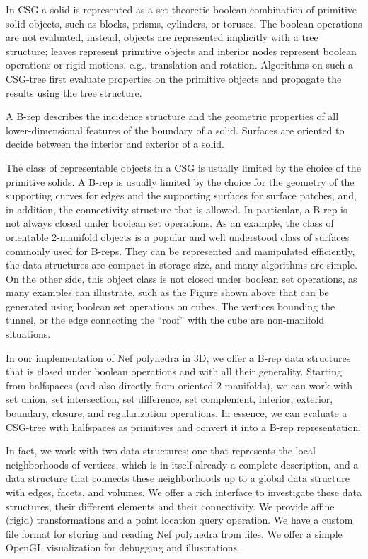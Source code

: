In CSG a solid is represented as a set-theoretic boolean combination
of primitive solid objects, such as blocks, prisms, cylinders, or
toruses.  The boolean operations are not evaluated, instead, objects
are represented implicitly with a tree structure; leaves represent
primitive objects and interior nodes represent boolean operations or
rigid motions, e.g., translation and rotation. Algorithms on such a
CSG-tree first evaluate properties on the primitive objects and
propagate the results using the tree structure.
 
A B-rep describes the incidence structure and the geometric properties
of all lower-dimensional features of the boundary of a solid. Surfaces
are oriented to decide between the interior and exterior of a solid.

The class of representable objects in a CSG is usually limited by the
choice of the primitive solids. A B-rep is usually limited by the
choice for the geometry of the supporting curves for edges and the
supporting surfaces for surface patches, and, in addition, the
connectivity structure that is allowed. In particular, a B-rep is not
always closed under boolean set operations.  As an example, the class
of orientable 2-manifold objects is a popular and well understood
class of surfaces commonly used for B-reps. They can be represented
and manipulated efficiently, the data structures are compact in
storage size, and many algorithms are simple. On the other side, this
object class is not closed under boolean set operations, as many
examples can illustrate, such as the Figure shown above that can be
generated using boolean set operations on cubes. The vertices bounding
the tunnel, or the edge connecting the ``roof'' with the cube are
non-manifold situations.

In our implementation of Nef polyhedra in 3D, we offer a B-rep data
structures that is closed under boolean operations and with all their
generality. Starting from halfspaces (and also directly from oriented
2-manifolds), we can work with set union, set intersection, set
difference, set complement, interior, exterior, boundary, closure, and
regularization operations. In essence, we can evaluate a CSG-tree with
halfspaces as primitives and convert it into a B-rep representation.

In fact, we work with two data structures; one that represents the
local neighborhoods of vertices, which is in itself already a complete
description, and a data structure that connects these neighborhoods up
to a global data structure with edges, facets, and volumes. We offer a
rich interface to investigate these data structures, their different
elements and their connectivity. We provide affine (rigid)
transformations and a point location query operation. We have a custom
file format for storing and reading Nef polyhedra from files. We offer
a simple OpenGL visualization for debugging and illustrations.


